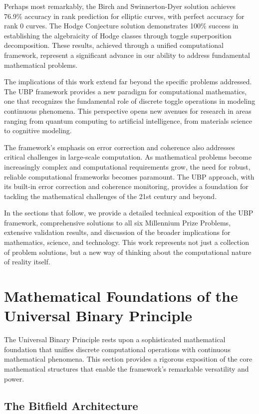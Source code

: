 \documentclass[11pt]{amsart}
\begin{document}
Perhaps most remarkably, the Birch and Swinnerton-Dyer solution achieves 76.9\% accuracy in rank prediction for elliptic curves, with perfect accuracy for rank 0 curves. The Hodge Conjecture solution demonstrates 100\% success in establishing the algebraicity of Hodge classes through toggle superposition decomposition. These results, achieved through a unified computational framework, represent a significant advance in our ability to address fundamental mathematical problems.

The implications of this work extend far beyond the specific problems addressed. The UBP framework provides a new paradigm for computational mathematics, one that recognizes the fundamental role of discrete toggle operations in modeling continuous phenomena. This perspective opens new avenues for research in areas ranging from quantum computing to artificial intelligence, from materials science to cognitive modeling.

The framework's emphasis on error correction and coherence also addresses critical challenges in large-scale computation. As mathematical problems become increasingly complex and computational requirements grow, the need for robust, reliable computational frameworks becomes paramount. The UBP approach, with its built-in error correction and coherence monitoring, provides a foundation for tackling the mathematical challenges of the 21st century and beyond.

In the sections that follow, we provide a detailed technical exposition of the UBP framework, comprehensive solutions to all six Millennium Prize Problems, extensive validation results, and discussion of the broader implications for mathematics, science, and technology. This work represents not just a collection of problem solutions, but a new way of thinking about the computational nature of reality itself.

\section{Mathematical Foundations of the Universal Binary Principle}

The Universal Binary Principle rests upon a sophisticated mathematical foundation that unifies discrete computational operations with continuous mathematical phenomena. This section provides a rigorous exposition of the core mathematical structures that enable the framework's remarkable versatility and power.

\subsection{The Bitfield Architecture}
\end{document}
